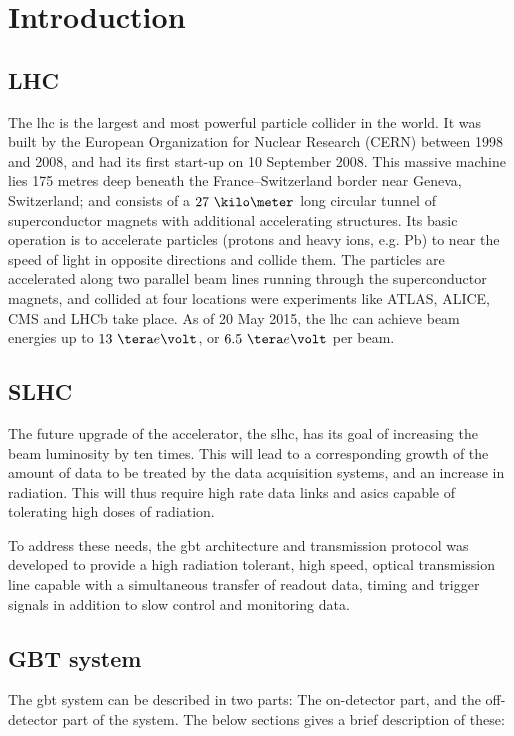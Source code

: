 \documentclass[main.tex]{subfiles}
\begin{document}
\chapter{Introduction}

\section{LHC}

The \gls{lhc} is the largest and most powerful particle collider in the world. It was built by the European Organization for Nuclear Research (CERN) \cite{cernweb} between 1998 and 2008, and had its first start-up on 10 September 2008. This massive machine lies 175 metres deep beneath the France–Switzerland border near Geneva, Switzerland; and consists of a $27~\kilo\meter$ long circular tunnel of superconductor magnets with additional accelerating structures. Its basic operation is to accelerate particles (protons and heavy ions, e.g. Pb) to near the speed of light in opposite directions and collide them. The particles are accelerated along two parallel beam lines running through the superconductor magnets, and collided at four locations were experiments like ATLAS\cite{atlasweb}, ALICE\cite{aliceweb}, CMS\cite{cmsweb} and LHCb\cite{lhcbweb} take place. As of 20 May 2015, the \gls{lhc} can achieve beam energies up to $13~\tera e\volt$, or $6.5~\tera e\volt$ per beam.

\section{SLHC}

The future upgrade of the  accelerator, the \gls{slhc}, has its goal of increasing the beam luminosity by ten times. This will lead to a corresponding growth of the amount of data to be treated by the data acquisition systems, and an increase in radiation. This will thus require high rate data links and \glspl{asic} capable of tolerating high doses of radiation.

To address these needs, the \gls{gbt} architecture and transmission protocol was developed to provide a high radiation tolerant, high speed, optical transmission line capable with a simultaneous transfer of readout data, timing and trigger signals in addition to slow control and monitoring data.

\section{GBT system}
The \gls{gbt} system can be described in two parts: The on-detector part, and the off-detector part of the system. The below sections gives a brief description of these:
\end{document}
